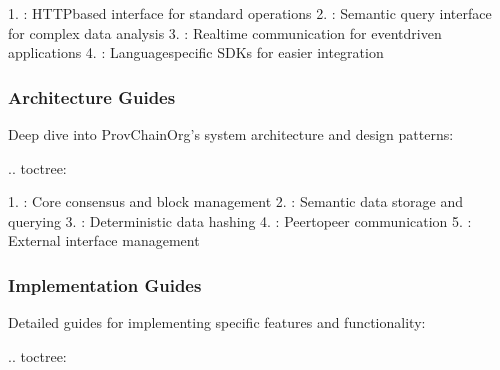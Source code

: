 \documentclass[letterpaper,10pt,english]{sphinxmanual}
\begin{document}
\sphinxAtStartPar
{}
1. : HTTP\sphinxhyphen{}based interface for standard operations
2. : Semantic query interface for complex data analysis
3. : Real\sphinxhyphen{}time communication for event\sphinxhyphen{}driven applications
4. : Language\sphinxhyphen{}specific SDKs for easier integration


\subsubsection{Architecture Guides}
\label{\detokenize{developer/index:architecture-guides}}
\sphinxAtStartPar
Deep dive into ProvChainOrg’s system architecture and design patterns:

\sphinxAtStartPar
{}
.. toctree:

\begin{sphinxVerbatim}[commandchars=\\\{\}]
 
  

\end{sphinxVerbatim}

\sphinxAtStartPar
{}
1. : Core consensus and block management
2. : Semantic data storage and querying
3. : Deterministic data hashing
4. : Peer\sphinxhyphen{}to\sphinxhyphen{}peer communication
5. : External interface management


\subsubsection{Implementation Guides}
\label{\detokenize{developer/index:implementation-guides}}
\sphinxAtStartPar
Detailed guides for implementing specific features and functionality:

\sphinxAtStartPar
{}
.. toctree:

\begin{sphinxVerbatim}[commandchars=\\\{\}]
 
  

\end{sphinxVerbatim}
\end{document}
